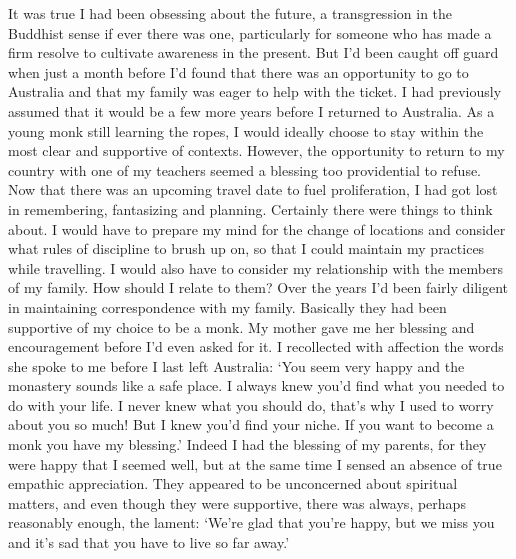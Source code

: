 It was true I had been obsessing about the future, a transgression in
the Buddhist sense if ever there was one, particularly for someone who
has made a firm resolve to cultivate awareness in the present. But I'd
been caught off guard when just a month before I'd found that there was
an opportunity to go to Australia and that my family was eager to help
with the ticket. I had previously assumed that it would be a few more
years before I returned to Australia. As a young monk still learning the
ropes, I would ideally choose to stay within the most clear and
supportive of contexts. However, the opportunity to return to my country
with one of my teachers seemed a blessing too providential to refuse.
Now that there was an upcoming travel date to fuel proliferation, I had
got lost in remembering, fantasizing and planning. Certainly there were
things to think about. I would have to prepare my mind for the change of
locations and consider what rules of discipline to brush up on, so that
I could maintain my practices while travelling. I would also have to
consider my relationship with the members of my family. How should I
relate to them? Over the years I'd been fairly diligent in maintaining
correspondence with my family. Basically they had been supportive of my
choice to be a monk. My mother gave me her blessing and encouragement
before I'd even asked for it. I recollected with affection the words she
spoke to me before I last left Australia: `You seem very happy and the
monastery sounds like a safe place. I always knew you'd find what you
needed to do with your life. I never knew what you should do, that's why
I used to worry about you so much! But I knew you'd find your niche. If
you want to become a monk you have my blessing.' Indeed I had the
blessing of my parents, for they were happy that I seemed well, but at
the same time I sensed an absence of true empathic appreciation. They
appeared to be unconcerned about spiritual matters, and even though they
were supportive, there was always, perhaps reasonably enough, the
lament: `We're glad that you're happy, but we miss you and it's sad that
you have to live so far away.'


